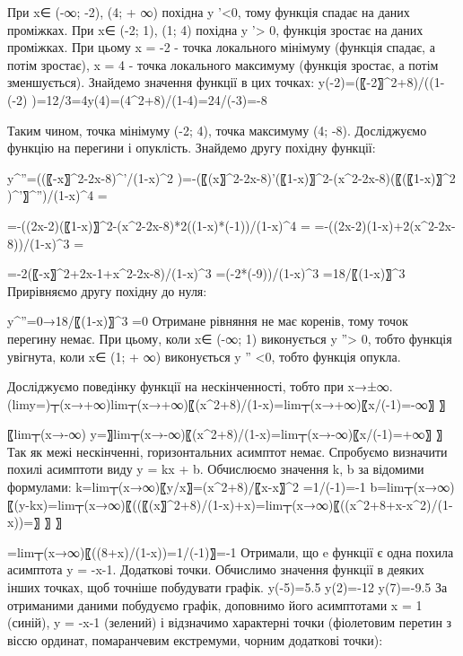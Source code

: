 При x∈ (-∞; -2), (4; + ∞) похідна y '<0, тому функція спадає на даних проміжках.
При x∈ (-2; 1), (1; 4) похідна y '> 0, функція зростає на даних проміжках.
При цьому x = -2 - точка локального мінімуму (функція спадає, а потім зростає), x = 4 - точка локального максимуму (функція зростає, а потім зменшується).
Знайдемо значення функції в цих точках:
y(-2)=(〖-2〗^2+8)/((1-(-2) )=12/3=4y(4)=(4^2+8)/(1-4)=24/(-3)=-8

Таким чином, точка мінімуму (-2; 4), точка максимуму (4; -8).
	Досліджуємо функцію на перегини і опуклість. Знайдемо другу похідну функції:

y^''=((〖-x〗^2-2x-8)^'/(1-x)^2 )=-(〖(x〗^2-2x-8)'(〖1-x)〗^2-(x^2-2x-8)(〖(〖1-x)〗^2 )^'〗^'')/(1-x)^4 =

=-((2x-2)(〖1-x)〗^2-(x^2-2x-8)*2((1-x)*(-1))/(1-x)^4 =
=-((2x-2)(1-x)+2(x^2-2x-8))/(1-x)^3 =

=-2(〖-x〗^2+2x-1+x^2-2x-8)/(1-x)^3 =(-2*(-9))/(1-x)^3 =18/〖(1-x)〗^3 
Прирівняємо другу похідну до нуля:

y^''=0→18/〖(1-x)〗^3 =0
Отримане рівняння не має коренів, тому точок перегину немає. При цьому, коли 
x∈ (-∞; 1) виконується y ''> 0, тобто функція увігнута, коли x∈ (1; + ∞) виконується y '' <0, тобто функція опукла.

	Досліджуємо поведінку функції на нескінченності, тобто при x→±∞.
(lim⁡y=)┬(x→+∞)⁡lim┬(x→+∞)⁡〖(x^2+8)/(1-x)=lim┬(x→+∞)⁡〖x/(-1)=-∞〗 〗 

〖lim┬(x→-∞) y=〗⁡lim┬(x→-∞)⁡〖(x^2+8)/(1-x)=lim┬(x→-∞)⁡〖x/(-1)=+∞〗 〗 
Так як межі нескінченні, горизонтальних асимптот немає.
Спробуємо визначити похилі асимптоти виду y = kx + b. Обчислюємо значення k, b за відомими формулами:
k=lim┬(x→∞)⁡〖y/x〗=(x^2+8)/〖x-x〗^2 =1/(-1)=-1
b=lim┬(x→∞)⁡〖(y-kx)=lim┬(x→∞)⁡〖((〖(x〗^2+8)/(1-x)+x)=lim┬(x→∞)⁡〖((x^2+8+x-x^2)/(1-x))=〗 〗 〗

=lim┬(x→∞)⁡〖((8+x)/(1-x))=1/(-1)〗=-1
Отримали, що e функції є одна похила асимптота y = -x-1.
	Додаткові точки. Обчислимо значення функції в деяких інших точках, щоб точніше побудувати графік.
 y(-5)=5.5      y(2)=-12      y(7)=-9.5
	За отриманими даними побудуємо графік, доповнимо його асимптотами x = 1 (синій), y = -x-1 (зелений) і відзначимо характерні точки (фіолетовим перетин з віссю ординат, помаранчевим екстремуми, чорним додаткові точки):


